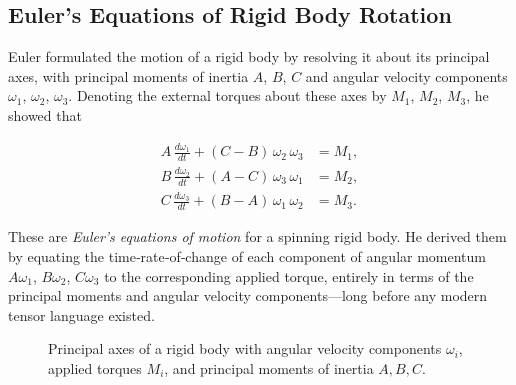 \subsection{Euler’s Equations of Rigid Body Rotation}

Euler formulated the motion of a rigid body by resolving it about its principal axes, with principal moments of inertia \(A\), \(B\), \(C\) and angular velocity components \(\omega_{1}\), \(\omega_{2}\), \(\omega_{3}\).  Denoting the external torques about these axes by \(M_{1}\), \(M_{2}\), \(M_{3}\), he showed that

\[
\begin{aligned}
A\,\frac{d\omega_{1}}{dt} + (C - B)\,\omega_{2}\,\omega_{3} &= M_{1},\\
B\,\frac{d\omega_{2}}{dt} + (A - C)\,\omega_{3}\,\omega_{1} &= M_{2},\\
C\,\frac{d\omega_{3}}{dt} + (B - A)\,\omega_{1}\,\omega_{2} &= M_{3}.
\end{aligned}
\]

These are \emph{Euler’s equations of motion} for a spinning rigid body.  He derived them by equating the time‐rate‐of‐change of each component of angular momentum \(A\omega_{1}\), \(B\omega_{2}\), \(C\omega_{3}\) to the corresponding applied torque, entirely in terms of the principal moments and angular velocity components—long before any modern tensor language existed.  

\begin{figure}[H]
    \centering
    \caption{Principal axes of a rigid body with angular velocity components $\omega_i$, applied torques $M_i$, and principal moments of inertia $A,B,C$.}
    \label{fig:euler-rigid-body-axes}
\end{figure}



